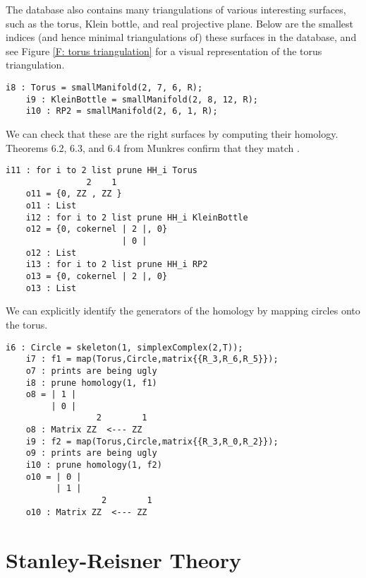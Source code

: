\documentclass[12pt,leqno]{amsart}
\theoremstyle{definition}
\newenvironment{example}
{\pushQED{\qed}\renewcommand{\qedsymbol}{$\diamond$}\examplex}
{\popQED\endexamplex}
\begin{document}
The database also contains many triangulations of various interesting surfaces, such as the torus, Klein bottle, and real projective plane. Below are the smallest indices (and hence minimal triangulations of) these surfaces in the database, and see Figure \ref{F: torus triangulation} for a visual representation of the torus triangulation.

\begin{example}\label{E: common surfaces and homology}
  \begin{lstlisting}[basicstyle={\ttfamily \scriptsize}, xleftmargin=-23pt]
    i8 : Torus = smallManifold(2, 7, 6, R);
    i9 : KleinBottle = smallManifold(2, 8, 12, R);
    i10 : RP2 = smallManifold(2, 6, 1, R);
  \end{lstlisting}
  We can check that these are the right surfaces by computing their homology. Theorems 6.2, 6.3, and 6.4 from Munkres confirm that they match \cite{Munkres}.
  \begin{lstlisting}[basicstyle={\ttfamily \scriptsize}, xleftmargin=-23pt]
    i11 : for i to 2 list prune HH_i Torus
                2    1
    o11 = {0, ZZ , ZZ }
    o11 : List
    i12 : for i to 2 list prune HH_i KleinBottle
    o12 = {0, cokernel | 2 |, 0}
                       | 0 |
    o12 : List
    i13 : for i to 2 list prune HH_i RP2
    o13 = {0, cokernel | 2 |, 0}
    o13 : List
\end{lstlisting}
  We can explicitly identify the generators of the homology by mapping circles onto the torus.
  \begin{lstlisting}[basicstyle={\ttfamily \scriptsize}, xleftmargin=-23pt]
    i6 : Circle = skeleton(1, simplexComplex(2,T));
    i7 : f1 = map(Torus,Circle,matrix{{R_3,R_6,R_5}});
    o7 : prints are being ugly
    i8 : prune homology(1, f1)
    o8 = | 1 |
         | 0 |
                  2        1
    o8 : Matrix ZZ  <--- ZZ
    i9 : f2 = map(Torus,Circle,matrix{{R_3,R_0,R_2}});
    o9 : prints are being ugly
    i10 : prune homology(1, f2)
    o10 = | 0 |
          | 1 |
                   2        1
    o10 : Matrix ZZ  <--- ZZ
\end{lstlisting}
\end{example}

\section{Stanley-Reisner Theory}
\label{S:Stanley-Reisner Theory}
\end{document}

